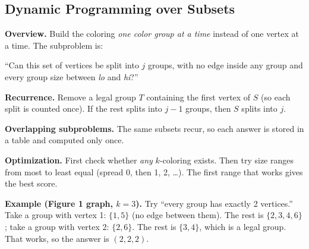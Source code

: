 \documentclass[11pt]{article}
\begin{document}
\subsection{Dynamic Programming over Subsets}

\textbf{Overview.} Build the coloring \emph{one color group at a time}
instead of one vertex at a time. The subproblem is:

\begin{center}
``Can this set of vertices be split into $j$ groups, with no edge inside
any group and every group size between \emph{lo} and \emph{hi}?''
\end{center}

\begin{minipage}{0.5\textwidth}
\textbf{Recurrence.} Remove a legal group $T$ containing the first vertex of
$S$ (so each split is counted once). If the rest splits into $j-1$ groups,
then $S$ splits into $j$.

\textbf{Overlapping subproblems.} The same subsets recur, so each answer is
stored in a table and computed only once.
\end{minipage}\hfill
\begin{minipage}{0.46\textwidth}
\centering
{}
\end{minipage}

\textbf{Optimization.} First check whether \emph{any} $k$-coloring exists.
Then try size ranges from most to least equal (spread 0, then 1, 2,
\dots). The first range that works gives the best score.

\textbf{Example (Figure 1 graph, $k=3$).} Try ``every group has exactly 2
vertices.'' Take a group with vertex 1: $\{1,5\}$ (no edge between them).
The rest is $\{2,3,4,6\}$; take a group with vertex 2: $\{2,6\}$. The rest is
$\{3,4\}$, which is a legal group. That works, so the answer is $(2,2,2)$.
\end{document}

